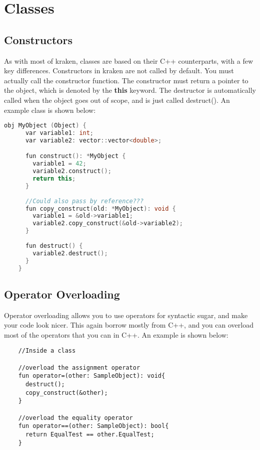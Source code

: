 \documentclass{article}
\begin{document}

\section{Classes}
  \subsection{Constructors}
    As with most of kraken, classes are based on their C++ counterparts, with
  a few key differences.  Constructors in kraken are not called by default.  
  You must actually call the constructor function.  The constructor must return
  a pointer to the object, which is denoted by the {\bf{this}} keyword.  
  The destructor is automatically called when the object goes out of scope, 
  and is just called destruct().  An example class is shown below:
  \begin{lstlisting}[language=C++]
    obj MyObject (Object) {
      var variable1: int;
      var variable2: vector::vector<double>;

      fun construct(): *MyObject {
        variable1 = 42;
        variable2.construct();
        return this;
      }
      
      //Could also pass by reference???
      fun copy_construct(old: *MyObject): void {
        variable1 = &old->variable1;
        variable2.copy_construct(&old->variable2); 
      }
      
      fun destruct() {
        variable2.destruct();
      }
    }
  \end{lstlisting}
  \subsection{Operator Overloading}
    Operator overloading allows you to use operators for syntactic sugar, and
  make your code look nicer.  This again borrow mostly from C++, and you can
  overload most of the operators that you can in C++.  An example is shown
  below:
  \begin{lstlisting}
    //Inside a class
    
    //overload the assignment operator 
    fun operator=(other: SampleObject): void{
      destruct();
      copy_construct(&other);
    }
    
    //overload the equality operator
    fun operator==(other: SampleObject): bool{
      return EqualTest == other.EqualTest;
    }
  \end{lstlisting}
\end{document}
